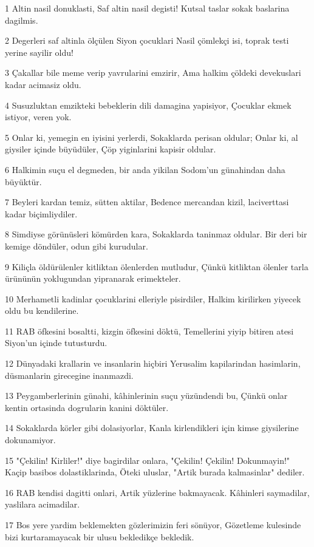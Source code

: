\par 1 Altin nasil donuklasti, Saf altin nasil degisti! Kutsal taslar sokak baslarina dagilmis.
\par 2 Degerleri saf altinla ölçülen Siyon çocuklari Nasil çömlekçi isi, toprak testi yerine sayilir oldu!
\par 3 Çakallar bile meme verip yavrularini emzirir, Ama halkim çöldeki devekuslari kadar acimasiz oldu.
\par 4 Susuzluktan emzikteki bebeklerin dili damagina yapisiyor, Çocuklar ekmek istiyor, veren yok.
\par 5 Onlar ki, yemegin en iyisini yerlerdi, Sokaklarda perisan oldular; Onlar ki, al giysiler içinde büyüdüler, Çöp yiginlarini kapisir oldular.
\par 6 Halkimin suçu el degmeden, bir anda yikilan Sodom'un günahindan daha büyüktür.
\par 7 Beyleri kardan temiz, sütten aktilar, Bedence mercandan kizil, laciverttasi kadar biçimliydiler.
\par 8 Simdiyse görünüsleri kömürden kara, Sokaklarda taninmaz oldular. Bir deri bir kemige döndüler, odun gibi kurudular.
\par 9 Kiliçla öldürülenler kitliktan ölenlerden mutludur, Çünkü kitliktan ölenler tarla ürününün yoklugundan yipranarak erimekteler.
\par 10 Merhametli kadinlar çocuklarini elleriyle pisirdiler, Halkim kirilirken yiyecek oldu bu kendilerine.
\par 11 RAB öfkesini bosaltti, kizgin öfkesini döktü, Temellerini yiyip bitiren atesi Siyon'un içinde tutusturdu.
\par 12 Dünyadaki krallarin ve insanlarin hiçbiri Yerusalim kapilarindan hasimlarin, düsmanlarin girecegine inanmazdi.
\par 13 Peygamberlerinin günahi, kâhinlerinin suçu yüzündendi bu, Çünkü onlar kentin ortasinda dogrularin kanini döktüler.
\par 14 Sokaklarda körler gibi dolasiyorlar, Kanla kirlendikleri için kimse giysilerine dokunamiyor.
\par 15 "Çekilin! Kirliler!" diye bagirdilar onlara, "Çekilin! Çekilin! Dokunmayin!" Kaçip basibos dolastiklarinda, Öteki uluslar, "Artik burada kalmasinlar" dediler.
\par 16 RAB kendisi dagitti onlari, Artik yüzlerine bakmayacak. Kâhinleri saymadilar, yaslilara acimadilar.
\par 17 Bos yere yardim beklemekten gözlerimizin feri sönüyor, Gözetleme kulesinde bizi kurtaramayacak bir ulusu bekledikçe bekledik.
